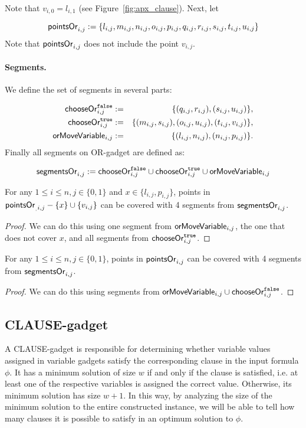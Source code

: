 Note that $v_{i, 0} = l_{i, 1}$ (see Figure~\ref{fig:apx_clause}).
Next, let

$$\mathsf{pointsOr}_{i,j} := 
 \{l_{i, j}, m_{i, j}, n_{i, j}, o_{i, j},
 p_{i, j}, q_{i, j}, r_{i, j}, s_{i, j}, t_{i, j}, u_{i, j} \}
 $$
Note that $\mathsf{pointsOr}_{i,j}$ does not include the point $v_{i,j}$.
 
\paragraph{Segments.}

We define the set of segments in several parts:
 
 
\begin{eqnarray*}
\mathsf{chooseOr}^{\texttt{false}}_{i,j} &:=& \{ (q_{i, j}, r_{i, j}), (s_{i, j}, u_{i, j})\}, \\
\mathsf{chooseOr}^{\texttt{true}}_{i,j} &:=& \{ (m_{i, j}, s_{i, j}), (o_{i, j}, u_{i, j}), (t_{i, j}, v_{i, j}) \}, \\
\mathsf{orMoveVariable}_{i,j} &:=& \{ (l_{i, j}, n_{i, j}), (n_{i, j}, p_{i, j})\}.
\end{eqnarray*}
Finally all segments on OR-gadget are defined as:

$$\mathsf{segmentsOr}_{i,j} := 
  \mathsf{chooseOr}^{\texttt{false}}_{i,j} \cup \mathsf{chooseOr}^{\texttt{true}}_{i,j} \cup \mathsf{orMoveVariable}_{i,j}
$$


\begin{lemma}
\label{cover_or_true}
For any $1 \le i \le n, j \in \{0, 1\}$ and 
 $x \in \{l_{i, j}, p_{i, j}\}$, points in
${\mathsf{pointsOr}_{_,i, j} - \{ x\} \cup \{v_{i, j}\}}$
can be covered
with 4 segments from $\mathsf{segmentsOr}_{i,j}$.
\end{lemma}

\begin{proof}
We can do this using one segment from
$\mathsf{orMoveVariable}_{i,j}$, the one that does not cover $x$,
and all segments from $\mathsf{chooseOr}^{\texttt{true}}_{i,j}$.
\end{proof}

\begin{lemma}
\label{cover_or_false}
For any $1 \le i \le n, j \in \{0, 1\}$, points in
$\mathsf{pointsOr}_{i,j}$ can be covered
with 4 segments from $\mathsf{segmentsOr}_{i,j}$.
\end{lemma}

\begin{proof}
We can do this using segments from $\mathsf{orMoveVariable}_{i,j} \cup \mathsf{chooseOr}^{\texttt{false}}_{i,j}$.
\end{proof}


\subsection{CLAUSE-gadget}
A CLAUSE-gadget is responsible for determining whether
variable values assigned in variable gadgets
satisfy the corresponding clause in the input formula $\phi$.
It has a minimum solution of size $w$
if and only if the clause is satisfied, i.e. at least one
of the respective variables is assigned the correct value.
Otherwise, its minimum solution has size $w+1$.
In this way, by analyzing the size of the minimum
solution to the entire constructed instance, we will be able to tell
how many clauses it is possible to satisfy
in an optimum solution to $\phi$.


